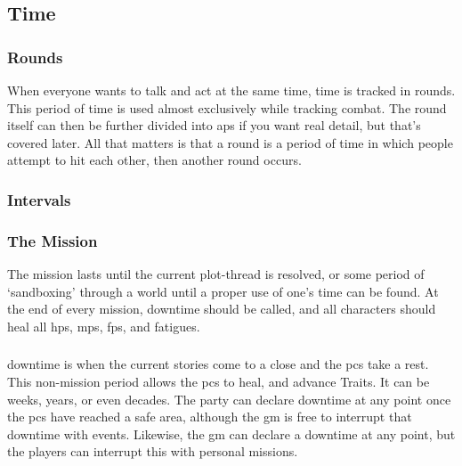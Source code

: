 \begin{multicols}{2}

\subsection{Time}
\label{time}

\subsubsection{Rounds}

When everyone wants to talk and act at the same time, time is tracked in \glspl{round}.
This period of time is used almost exclusively while tracking combat.
The \gls{round} itself can then be further divided into \glspl{ap} if you want real detail, but that's covered later.
All that matters is that a \gls{round} is a period of time in which people attempt to hit each other, then another \gls{round} occurs.

\subsubsection{Intervals}



\subsubsection{The Mission}

The mission lasts until the current plot-thread is resolved, or some period of `sandboxing' through a world until a proper use of one's time can be found.
At the end of every mission, \gls{downtime} should be called, and all characters should heal all \glspl{hp}, \glspl{mp}, \glspl{fp}, and \glspl{fatigue}.

\subsubsection{}

\Gls{downtime} is when the current stories come to a close and the \glspl{pc} take a rest.
This non-mission period allows the \glspl{pc} to heal, and advance Traits.
It can be weeks, years, or even decades.
The party can declare \gls{downtime} at any point once the \glspl{pc} have reached a safe area, although the \gls{gm} is free to interrupt that \gls{downtime} with events.
Likewise, the \gls{gm} can declare a \gls{downtime} at any point, but the players can interrupt this with personal missions.


\end{multicols}
